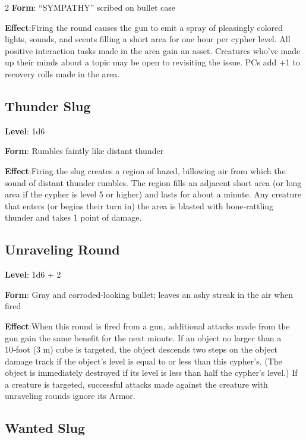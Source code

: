\begin{multicols}{2}
\textbf{Form}: “SYMPATHY” scribed on bullet case 

\textbf{Effect}:Firing the round causes the gun to emit a spray of pleasingly colored lights, sounds, and scents filling a short area for one hour per cypher level. All positive interaction tasks made in the area gain an asset. Creatures who’ve made up their minds about a topic may be open to revisiting the issue. PCs add +1 to recovery rolls made in the area.

\subsection{Thunder Slug} 

\textbf{Level}: 1d6 

\textbf{Form}: Rumbles faintly like distant thunder 

\textbf{Effect}:Firing the slug creates a region of hazed, billowing air from which the sound of distant thunder rumbles. The region fills an adjacent short area (or long area if the cypher is level 5 or higher) and lasts for about a minute. 
Any creature that enters (or begins their turn in) the area is blasted with bone‑rattling thunder and takes 1 point of damage. 

\subsection{Unraveling Round}

\textbf{Level}: 1d6 + 2 

\textbf{Form}: Gray and corroded‑looking bullet; leaves an ashy streak in the air when fired 

\textbf{Effect}:When this round is fired from a gun, additional attacks made from the gun gain the same benefit for the next minute. If an object no larger than a 10‑foot (3 m) cube is targeted, the object descends two steps on the object damage track if the object’s level is equal to or less than this cypher’s. (The object is immediately destroyed if its level is less than half the cypher’s level.) 
If a creature is targeted, successful attacks made against the creature with unraveling rounds ignore its Armor.

\subsection{Wanted Slug}


\end{multicols}
